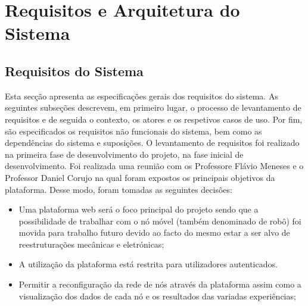 \chapter{Requisitos e Arquitetura do Sistema}
\label{chp:requirements}
\section{Requisitos do Sistema}
Esta secção apresenta as especificações gerais dos requisitos do sistema. As seguintes subseções descrevem, em primeiro lugar, o processo de levantamento de requisitos e de seguida o contexto, os atores e os respetivos casos de uso. Por fim, são especificados os requisitos não funcionais do sistema, bem como as dependências do sistema e suposições.\newline
O levantamento de requisitos foi realizado na primeira fase de desenvolvimento do projeto,  na fase inicial de desenvolvimento. Foi realizada uma reunião com os Professore Flávio Meneses e o Professor Daniel Corujo na qual foram expostos os principais objetivos da plataforma.\newline
Desse modo, foram tomadas as seguintes decisões:\newline
\begin{itemize}
    \item Uma plataforma web será o foco principal do projeto sendo que a possibilidade de trabalhar com o nó móvel (também denominado de robô) foi movida para trabalho futuro devido ao facto do mesmo estar a ser alvo de reestruturações mecânicas e eletrónicas;
    \item A utilização da plataforma está restrita para utilizadores autenticados.
    \item Permitir a reconfiguração da rede de nós através da plataforma assim como a visualização dos dados de cada nó e os resultados das variadas experiências;
\end{itemize}

